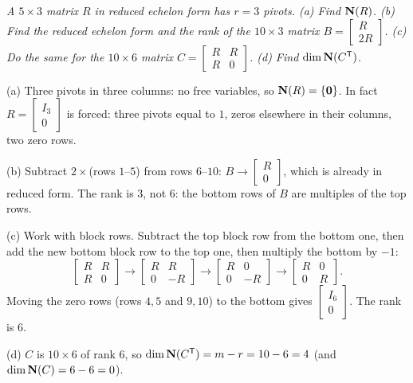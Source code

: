 \begin{example}\label{ex:u14-blocks}
\emph{A $5\times3$ matrix $R$ in reduced echelon form has $r=3$ pivots. (a) Find $\mathbf{N}(R)$. (b) Find
the reduced echelon form and the rank of the $10\times3$ matrix $B=\begin{bmatrix}R\\2R\end{bmatrix}$.
(c) Do the same for the $10\times6$ matrix $C=\begin{bmatrix}R&R\\R&0\end{bmatrix}$. (d) Find
$\dim\mathbf{N}(C^{\mathsf{T}})$.}

(a) Three pivots in three columns: no free variables, so $\mathbf{N}(R)=\{\boldsymbol{0}\}$. In fact
$R=\begin{bmatrix}I_3\\0\end{bmatrix}$ is forced: three pivots equal to $1$, zeros elsewhere in
their columns, two zero rows.

(b) Subtract $2\times$(rows $1$--$5$) from rows $6$--$10$: $B\to\begin{bmatrix}R\\0\end{bmatrix}$,
which is already in reduced form. The rank is $3$, not $6$: the bottom rows of $B$ are multiples of
the top rows.

(c) Work with block rows. Subtract the top block row from the bottom one, then add the new bottom
block row to the top one, then multiply the bottom by $-1$:
\[
\begin{bmatrix}R&R\\R&0\end{bmatrix}\to\begin{bmatrix}R&R\\0&-R\end{bmatrix}\to
\begin{bmatrix}R&0\\0&-R\end{bmatrix}\to\begin{bmatrix}R&0\\0&R\end{bmatrix}.
\]
Moving the zero rows (rows $4,5$ and $9,10$) to the bottom gives
$\begin{bmatrix}I_6\\0\end{bmatrix}$. The rank is $6$.

(d) $C$ is $10\times6$ of rank $6$, so $\dim\mathbf{N}(C^{\mathsf{T}})=m-r=10-6=4$ (and $\dim\mathbf{N}(C)=6-6=0$).
\end{example}

